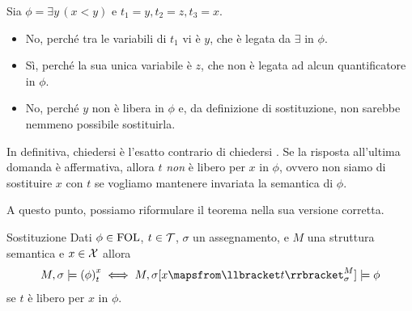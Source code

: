 \begin{example}{}
  Sia \(\phi = \exists y \, (x < y)\) e \(t_1 = y, t_2 = z, t_3 = x\).
  \begin{itemize}
    \item {} No, perché tra le variabili di \(t_1\) vi è \(y\), che è legata da \(\exists\) in \(\phi\).
    \item {} Sì, perché la sua unica variabile è \(z\), che non è legata ad alcun quantificatore in \(\phi\).
    \item {} No, perché \(y\) non è libera in \(\phi\) e, da definizione di sostituzione, non sarebbe nemmeno possibile sostituirla.
  \end{itemize}

  In definitiva, chiedersi  è l'esatto contrario di chiedersi .
  Se la risposta all'ultima domanda è affermativa, allora \(t\) \emph{non} è libero per \(x\) in \(\phi\), ovvero non siamo  di sostituire \(x\) con \(t\) se vogliamo mantenere invariata la semantica di \(\phi\).
\end{example}

A questo punto, possiamo riformulare il teorema nella sua versione corretta.

\begin{theorem}[namedlabel={thm:fol_substitution}{Sostituzione}]{Sostituzione}
  Dati \(\phi\in\FOL\), \(t\in \mathcal{T}\), \(\sigma\) un assegnamento, e \(M\) una struttura semantica e \(x\in\mathcal{X}\) allora
  \[M,\sigma \models \subs{\phi}{x}{t} \iff M,\sigma[x\mapsfrom \den{t}[M][\sigma]] \models \phi\]
  se \(t\) è libero per \(x\) in \(\phi\).
\end{theorem}

